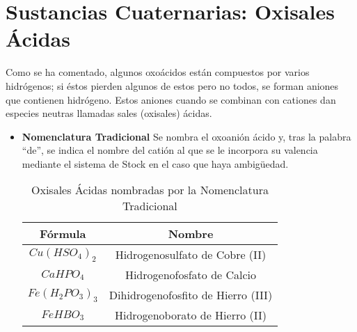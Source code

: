 \section{Sustancias Cuaternarias: Oxisales Ácidas}
Como se ha comentado, algunos oxoácidos están compuestos por varios hidrógenos; si éstos pierden algunos de estos pero no todos, se forman aniones que contienen hidrógeno. Estos aniones cuando se combinan con cationes dan especies neutras llamadas sales (oxisales) ácidas.\\
\begin{itemize}
	\item \textbf{Nomenclatura Tradicional} Se nombra el oxoanión ácido y, tras la palabra “de”, se indica el nombre del catión al que se le incorpora su valencia mediante el sistema de Stock en el caso que haya ambigüedad.
	\begin{table}[h!]
		\centering
		\begin{tabular}{c|c}
			Fórmula&Nombre\\ \hline
			$Cu(HSO_4)_2$&Hidrogenosulfato de Cobre (II)\\
			$CaHPO_4$&Hidrogenofosfato de Calcio\\
			$Fe(H_2PO_3)_3$&Dihidrogenofosfito de Hierro (III)\\
			$FeHBO_3$&Hidrogenoborato de Hierro (II)\\ \hline
		\end{tabular}
		\caption{Oxisales Ácidas nombradas por la Nomenclatura Tradicional}
	\end{table}


\end{itemize}
